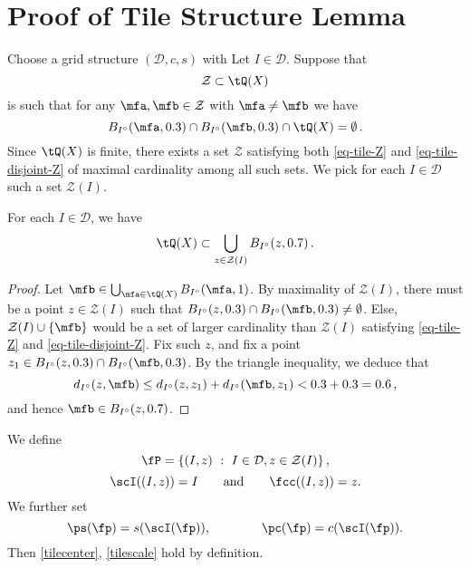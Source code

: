 \section{Proof of Tile Structure Lemma}
\label{subsectiles}
Choose a grid structure $(\mathcal{D}, c, s)$ with 
Let $I \in \mathcal{D}$. Suppose that
\begin{equation}
    \label{eq-tile-Z}
    \mathcal{Z} \subset \tQ(X)
\end{equation}
is such that for any $\mfa, \mfb \in \mathcal{Z}$ with $\mfa\ne \mfb$ we have
\begin{equation}
    \label{eq-tile-disjoint-Z}
    B_{I^\circ}(\mfa, 0.3) \cap B_{I^\circ}(\mfb, 0.3) \cap \tQ(X) = \emptyset\,.
\end{equation}
Since $\tQ(X)$ is finite, there exists a set $\mathcal{Z}$ satisfying both \eqref{eq-tile-Z} and \eqref{eq-tile-disjoint-Z} of maximal cardinality among all such sets. We pick for each $I \in \mathcal{D}$ such a set $\mathcal{Z}(I)$.

\begin{lemma}
    \label{frequency-ball-cover}
    \leanok
    For each $I \in \mathcal{D}$, we have
    \begin{equation}
        \label{eq-tile-cover}
        \tQ(X) \subset \bigcup_{z \in \mathcal{Z}(I)} B_{I^\circ}(z, 0.7)\,.
    \end{equation}
\end{lemma}

\begin{proof}
    Let $\mfb \in \bigcup_{\mfa \in \tQ(X)} B_{I^\circ}(\mfa, 1)$. By maximality of $\mathcal{Z}(I)$, there must be a point $z \in \mathcal{Z}(I)$ such that $B_{I^\circ}(z, 0.3) \cap B_{I^\circ}(\mfb, 0.3) \ne \emptyset$. Else, $\mathcal{Z}(I) \cup \{\mfb\}$ would be a set of larger cardinality than $\mathcal{Z}(I)$ satisfying \eqref{eq-tile-Z} and \eqref{eq-tile-disjoint-Z}. Fix such $z$, and fix a point $z_1 \in B_{I^\circ}(z, 0.3) \cap B_{I^\circ}(\mfb, 0.3)$. By the triangle inequality, we deduce that
    $$
        d_{I^\circ}(z,\mfb) \le d_{I^\circ}(z,z_1) + d_{I^\circ}(\mfb, z_1) < 0.3 + 0.3 = 0.6\,,
    $$
    and hence $\mfb \in B_{I^\circ}(z, 0.7)$.
\end{proof}

We define
$$
    \fP = \{(I, z) \ : \ I \in \mathcal{D}, z \in \mathcal{Z}(I)\}\,,
$$
$$\scI((I, z)) = I\qquad \text{and} \qquad \fcc((I, z)) = z.$$ We further set $$\ps(\fp) = s(\scI(\fp)),\qquad \qquad \pc(\fp) = c(\scI(\fp)).$$ Then \eqref{tilecenter}, \eqref{tilescale} hold by definition.

